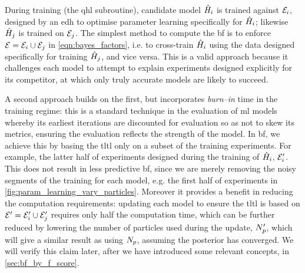During training (the \gls{qhl} subroutine), candidate model $\hat{H}_i$ is trained against ${ \mathcal{E} }_i$, 
    designed by an \gls{edh} to optimise parameter learning specifically for $\hat{H}_i$;
    likewise $\hat{H}_j$ is trained on ${ \mathcal{E} }_j$. 
The simplest method to compute the \gls{bf} is to enforce ${ \mathcal{E} }={ \mathcal{E} }_i \cup { \mathcal{E} }_j$ 
    in \cref{eqn:bayes_factors}, i.e. to cross-train $\hat{H}_i$ using the data designed specifically for training $\hat{H}_j$, 
    and vice versa. 
This is a valid approach because it challenges each model to attempt to explain experiments
    designed explicitly for its competitor,   
    at which only truly accurate models are likely to succeed. 
\par 
A second approach builds on the first, but incorporates \emph{burn--in} time in the training regime:
    this is a standard technique in the evaluation of \gls{ml} models whereby its earliest iterations 
    are discounted for evaluation so as not to skew its metrics, 
    ensuring the evaluation reflects the strength of the model. 
In \gls{bf}, we achieve this by basing the \gls{tltl} only on a subset of the training experiments. 
For example, the latter half of experiments designed during the training of $\hat{H}_i$, ${ \mathcal{E} }_i^{\prime}$. 
This does not result in less predictive \gls{bf}, since we are merely removing the 
    noisy segments of the training for each model, e.g. the first half of experiments in \cref{fig:param_learning_vary_particles}. 
Moreover it provides a benefit in reducing the computation requirements: 
    updating each model to ensure the \gls{tltl} is based on ${ \mathcal{E} }^{\prime}={ \mathcal{E} }_i^{\prime} \cup { \mathcal{E} }_j^{\prime}$
    requires only half the computation time, 
    which can be further reduced by lowering the number of particles used during the update, $N_p^{\prime}$, 
    which will give a similar result as using $N_p$, assuming the posterior has converged.
We will verify this claim later, after we have introduced some relevant concepts, in \cref{sec:bf_by_f_score}. 
\par 

